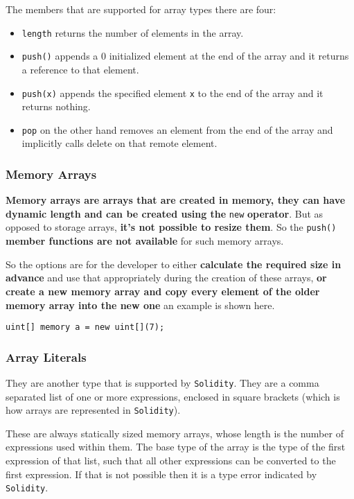 The members that are supported for array types there are four:

\begin{itemize}
\tightlist
\item
  \texttt{length} returns the number of elements in the array.
\item
  \texttt{push()} appends a 0 initialized element at the end of the
  array and it returns a reference to that element.
\item
  \texttt{push(x)} appends the specified element \texttt{x} to the end
  of the array and it returns nothing.
\item
  \texttt{pop} on the other hand removes an element from the end of the
  array and implicitly calls delete on that remote element.
\end{itemize}

\subsubsection{Memory Arrays}\label{memory-arrays}

\textbf{Memory arrays are arrays that are created in memory, they can
have dynamic length and can be created using the} \texttt{new}
\textbf{operator}. But as opposed to storage arrays, \textbf{it's not
possible to resize them}. So the \texttt{push()} \textbf{member
functions are not available} for such memory arrays.

So the options are for the developer to either \textbf{calculate the
required size in advance} and use that appropriately during the creation
of these arrays, \textbf{or create a new memory array and copy every
element of the older memory array into the new one} an example is shown
here.

\begin{lstlisting}[language=Solidity,numbers=none]
uint[] memory a = new uint[](7);
\end{lstlisting}

\subsubsection{Array Literals}\label{array-literals}

They are another type that is supported by \texttt{Solidity}. They are a
comma separated list of one or more expressions, enclosed in square
brackets (which is how arrays are represented in \texttt{Solidity}).

These are always statically sized memory arrays, whose length is the
number of expressions used within them. The base type of the array is
the type of the first expression of that list, such that all other
expressions can be converted to the first expression. If that is not
possible then it is a type error indicated by \texttt{Solidity}.

